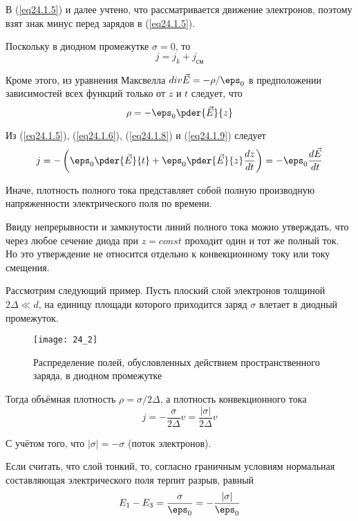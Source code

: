 В (\ref{eq24.1.5}) и далее учтено, что рассматривается движение электронов, 
поэтому взят знак минус перед зарядов в (\ref{eq24.1.5}).

Поскольку в диодном промежутке \( \sigma = 0 \), то 
\begin{equation}
	j = j_k + j_\text{см}
	\label{eq24.1.8}
\end{equation}

Кроме этого, из уравнения Максвелла \( div\vec{E} = -\rho/\eps_0 \) в 
предположении зависимостей всех функций только от \( z \) и \( t \) следует, 
что 
\begin{equation}
	\rho = -\eps_0 \pder{\vec{E}}{z}
	\label{eq24.1.9}
\end{equation}

Из (\ref{eq24.1.5}), (\ref{eq24.1.6}), (\ref{eq24.1.8}) и (\ref{eq24.1.9}) следует 
\[
	j = -\left( 
		\eps_0\pder{\vec{E}}{t} + \eps_0\pder{\vec{E}}{z}\frac{dz}{dt}
	\right) = -\eps_0 \frac{d\vec{E}}{dt}
\]

Иначе, плотность полного тока представляет собой полную производную 
напряженности электрического поля по времени.

Ввиду непрерывности и замкнутости линий полного тока можно утверждать, что 
через любое сечение диода при \( z = const \) проходит один и тот же полный 
ток. Но это утверждение не относится отдельно к конвекционному току или току 
смещения. 

Рассмотрим следующий пример. Пусть плоский слой электронов толщиной 
\( 2\Delta \ll d \), на единицу площади которого приходится заряд \( \sigma \) 
влетает в диодный промежуток.

\begin{figure}[h!]
	\center
	\texttt{[image: 24\_2]}
	\caption{Распределение полей, обусловленных действием пространственного 
		заряда, в диодном промежутке}
	\label{img24.2}
\end{figure}

Тогда объёмная плотность \( \rho = \sigma / 2\Delta \), а плотность 
конвекционного тока 
\begin{equation}
	j = -\frac{\sigma}{2\Delta}v = \frac{|\sigma|}{2\Delta} v
	\label{eq24.1.11}
\end{equation}

С учётом того, что \( |\sigma| = -\sigma \) (поток электронов).

Если считать, что слой тонкий, то, согласно граничным условиям нормальная 
составляющая электрического поля терпит разрыв, равный 
\begin{equation}
	E_1 - E_3 = \frac{\sigma}{\eps_0} = -\frac{|\sigma|}{\eps_0}
	\label{eq24.1.12}
\end{equation}

